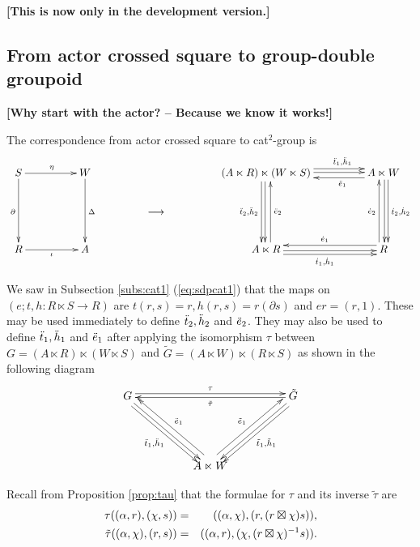 \newpage
\noindent
{\bf [This is now only in the development version.]}

\bigskip
\subsection{From actor crossed square to group-double groupoid}

{\bf [Why start with the actor? -- Because we know it works!]}

\bigskip\noindent
The correspondence from actor crossed square to cat$^2$-group is
$$
\xymatrix @C=4.0pc @R=2.0pc{
S \ar[r]^{\eta} \ar[dd]_{\partial}
  & W \ar[dd]^{\Delta} 
    & & (A \ltimes R)\ltimes(W \ltimes S) 
        \ar[r]<1.0ex>^(0.65){\ddtto,\ddhho} \ar[r]<0.2ex>
        \ar[dd]<-1.0ex>_{\ddttt,\ddhht} \ar[dd]<-0.2ex>
        & A \ltimes W  \ar[l]<1.0ex>^(0.35){\ddeeo} 
                       \ar[dd]<1.0ex>^{\dttt,\dhht} \ar[dd]<0.2ex>\\
  & & \longrightarrow
      & & \\
R \ar[r]_{\iota}
  & A
    & & A \ltimes R \ar[r]<-1.0ex>_{\dtto,\dhho} \ar[r]<-0.2ex>
                    \ar[uu]<-1.0ex>_{\ddeet}
        & R \ar[l]<-1.0ex>_{\deeo}  \ar[uu]<1.0ex>^{\deet}
}
$$

We saw in Subsection \ref{subs:cat1} (\ref{eq:sdpcat1}) that the maps on 
$(e;t,h: R \ltimes S \to R)$ are 
$t(r,s)=r, h(r,s)=r(\partial s)$ and $er = (r,1)$.
These may be used immediately to define $\ddot{t}_2,\ddot{h}_2$ and $\ddot{e}_2$.
They may also be used to define $\ddot{t}_1, \ddot{h}_1$ and $\ddot{e}_1$ 
after applying the isomorphism $\tau$
between $G = (A \ltimes R)\ltimes(W \ltimes S)$ 
and $\tilde{G} = (A \ltimes W)\ltimes(R \ltimes S)$ 
as shown in the following diagram
$$
\xymatrix @C=4.0pc @R=4.0pc{
G \ar[rr]<0.6ex>^{\tau}
  \ar[dr]<-0.2ex> \ar[dr]<-1.0ex>_{\ddtto,\ddhho}
  & & \tilde{G} \ar[dl]<0.2ex> \ar[dl]<1.0ex>^{\tilde{t}_1,\tilde{h}_1} 
                \ar[ll]<0.2ex>^{\tilde{\tau}} \\
  & A \ltimes W \ar[ul]<-1.0ex>_{\ddeeo} \ar[ur]<1.0ex>^{\tilde{e}_1}
    & \\
}
$$

\bigskip\noindent
Recall from Proposition \ref{prop:tau} that the formulae for $\tau$ 
and its inverse $\tilde{\tau}$ are
\begin{eqnarray*}
\tau((\alpha,r),(\chi,s))
 & = &  ((\alpha,\chi),(r,(r \boxtimes \chi)s)), \\
\tilde{\tau}((\alpha,\chi),(r,s)) 
 & = &  ((\alpha,r),(\chi,(r \boxtimes \chi)^{-1}s)). 
\end{eqnarray*}

